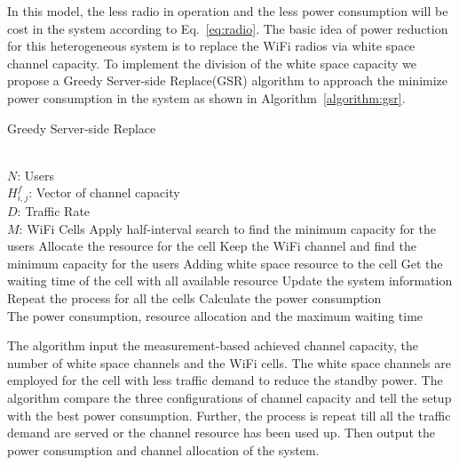 In this model, the less radio in operation and the less power consumption will be cost in the system according to 
Eq.~\ref{eq:radio}. 
The basic idea of power reduction for this heterogeneous system is to replace the WiFi radios via white space channel 
capacity. To implement the division of the white space capacity we propose a Greedy Server-side Replace(GSR) algorithm 
to approach the minimize power consumption in the system as shown in Algorithm~\ref{algorithm:gsr}. 

\begin{algorithm}[t]
\small
\caption{Greedy Server-side Replace}
\label{algorithm:gsr}
\begin{algorithmic}[1]
\REQUIRE  ~~\\
$N$: Users\\
$H_{i,j}^f$: Vector of channel capacity\\
$D$: Traffic Rate\\
$M$: WiFi Cells
\STATE Apply half-interval search to find the minimum capacity for the users
\STATE Allocate the resource for the cell
\STATE Keep the WiFi channel and find the minimum capacity for the users
\STATE Adding white space resource to the cell
\ENDIF
\ELSE 
\STATE Get the waiting time of the cell with all available resource
\ENDIF
\STATE Update the system information
\STATE Repeat the process for all the cells
\STATE Calculate the power consumption
\ENSURE ~~\\
The power consumption, resource allocation and the maximum waiting time\\
\end{algorithmic}
\end{algorithm}

The algorithm input the measurement-based achieved channel capacity, the number of white space channels and the WiFi cells. 
The white space channels are employed for the cell with less traffic demand to reduce the standby power. The algorithm 
compare the three configurations of channel capacity and tell the setup with the best power consumption. 
Further, the process is repeat till all the traffic demand are served or the channel resource has been used up.
Then output the power consumption and channel allocation of the system.



